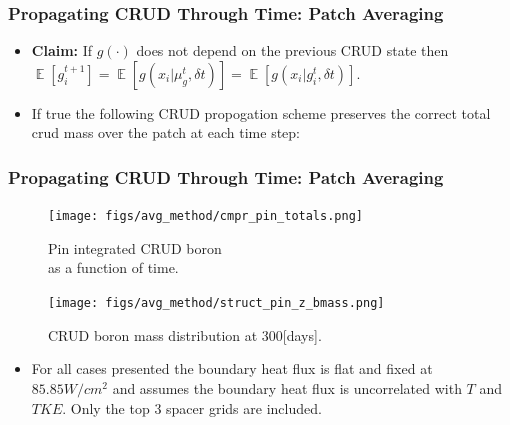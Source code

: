 \documentclass[t, pdftex]{beamer}
\DeclareMathOperator*{\E}{\mathbb{E}}
\begin{document}
\begin{frame}[shrink=5]
\frametitle{Propagating CRUD Through Time:  Patch Averaging}
\begin{itemize}
\item  \textbf{Claim:} If $g(\cdot)$ does not depend on the previous CRUD state then $\E[ g_i^{t+1}] =  \E[ g(x_i| \mu_g^{t}, \delta t)] = \E[ g( x_i| g_{i}^{t}, \delta t)]$.
\item If true the following CRUD propogation scheme preserves the correct total crud mass over the patch at each time step:
\begin{algorithm}[H]
\end{algorithm}
\end{itemize}
\end{frame}

\begin{frame}[shrink=10]
\frametitle{Propagating CRUD Through Time: Patch Averaging}
\begin{figure}[!htbp]
\centering
\begin{minipage}{.5\textwidth}
  \texttt{[image: figs/avg\_method/cmpr\_pin\_totals.png]}
\caption{Pin integrated CRUD boron \\ as a function of time.} 
\label{fig:crud_pre_map}
\end{minipage}%
\begin{minipage}{.5\textwidth}
  \texttt{[image: figs/avg\_method/struct\_pin\_z\_bmass.png]}
\caption{CRUD boron mass distribution at 300[days].}
\label{fig:crud_post_map}
\end{minipage}
\end{figure}
\begin{itemize}
\item \small For all cases presented the boundary heat flux is flat and fixed at $85.85 W/cm^2$ and assumes the boundary heat flux is uncorrelated with $T$ and $TKE$.  Only the top 3 spacer grids are included.
\end{itemize}
\end{frame}
\end{document}

